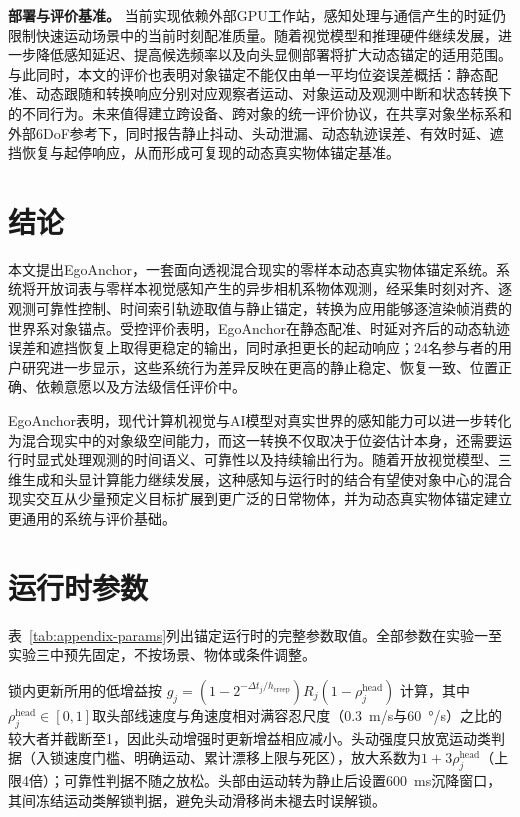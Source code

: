 \documentclass[review]{vgtc}
\begin{document}
\textbf{部署与评价基准。}
当前实现依赖外部GPU工作站，感知处理与通信产生的时延仍限制快速运动场景中的当前时刻配准质量。随着视觉模型和推理硬件继续发展，进一步降低感知延迟、提高候选频率以及向头显侧部署将扩大动态锚定的适用范围。与此同时，本文的评价也表明对象锚定不能仅由单一平均位姿误差概括：静态配准、动态跟随和转换响应分别对应观察者运动、对象运动及观测中断和状态转换下的不同行为。未来值得建立跨设备、跨对象的统一评价协议，在共享对象坐标系和外部6DoF参考下，同时报告静止抖动、头动泄漏、动态轨迹误差、有效时延、遮挡恢复与起停响应，从而形成可复现的动态真实物体锚定基准。

\section{结论}\label{sec:conclusion}

本文提出EgoAnchor，一套面向透视混合现实的零样本动态真实物体锚定系统。系统将开放词表与零样本视觉感知产生的异步相机系物体观测，经采集时刻对齐、逐观测可靠性控制、时间索引轨迹取值与静止锚定，转换为应用能够逐渲染帧消费的世界系对象锚点。受控评价表明，EgoAnchor在静态配准、时延对齐后的动态轨迹误差和遮挡恢复上取得更稳定的输出，同时承担更长的起动响应；24名参与者的用户研究进一步显示，这些系统行为差异反映在更高的静止稳定、恢复一致、位置正确、依赖意愿以及方法级信任评价中。

EgoAnchor表明，现代计算机视觉与AI模型对真实世界的感知能力可以进一步转化为混合现实中的对象级空间能力，而这一转换不仅取决于位姿估计本身，还需要运行时显式处理观测的时间语义、可靠性以及持续输出行为。随着开放视觉模型、三维生成和头显计算能力继续发展，这种感知与运行时的结合有望使对象中心的混合现实交互从少量预定义目标扩展到更广泛的日常物体，并为动态真实物体锚定建立更通用的系统与评价基础。

\raggedbottom




\clearpage
\appendix

\section{运行时参数}\label{sec:appendix}

表~\ref{tab:appendix-params}列出锚定运行时的完整参数取值。全部参数在实验一至实验三中预先固定，不按场景、物体或条件调整。

锁内更新所用的低增益按
$g_j = (1 - 2^{-\Delta t_j / h_{\mathrm{creep}}}) R_j
(1 - \rho_j^{\mathrm{head}})$
计算，其中$\rho_j^{\mathrm{head}} \in [0,1]$取头部线速度与角速度相对满容忍尺度（0.3~m/s与60~°/s）之比的较大者并截断至1，因此头动增强时更新增益相应减小。头动强度只放宽运动类判据（入锁速度门槛、明确运动、累计漂移上限与死区），放大系数为$1+3\rho_j^{\mathrm{head}}$（上限4倍）；可靠性判据不随之放松。头部由运动转为静止后设置600~ms沉降窗口，其间冻结运动类解锁判据，避免头动滑移尚未褪去时误解锁。
\end{document}
